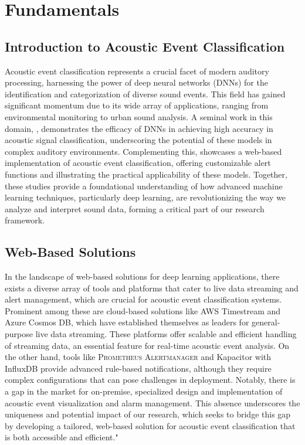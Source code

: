 \chapter{Fundamentals}
\section{Introduction to Acoustic Event Classification}

Acoustic event classification represents a crucial facet of modern auditory processing, harnessing the power of deep neural networks (DNNs) for the identification and categorization of diverse sound events. This field has gained significant momentum due to its wide array of applications, ranging from environmental monitoring to urban sound analysis. A seminal work in this domain, \cite{sampath2020low}, demonstrates the efficacy of DNNs in achieving high accuracy in acoustic signal classification, underscoring the potential of these models in complex auditory environments. Complementing this, \cite{sampath2019realtime} showcases a web-based implementation of acoustic event classification, offering customizable alert functions and illustrating the practical applicability of these models. Together, these studies provide a foundational understanding of how advanced machine learning techniques, particularly deep learning, are revolutionizing the way we analyze and interpret sound data, forming a critical part of our research framework.

\section{Web-Based Solutions}

In the landscape of web-based solutions for deep learning applications, there exists a diverse array of tools and platforms that cater to live data streaming and alert management, which are crucial for acoustic event classification systems. Prominent among these are cloud-based solutions like AWS Timestream\cite{AWSTimestream} and Azure Cosmos DB\cite{AzureCosmos}, which have established themselves as leaders for general-purpose live data streaming. These platforms offer scalable and efficient handling of streaming data, an essential feature for real-time acoustic event analysis. On the other hand, tools like \textsc{Prometheus} \textsc{Alertmanager}\cite{AlertManager} and Kapacitor with InfluxDB\cite{kapacitor} provide advanced rule-based notifications, although they require complex configurations that can pose challenges in deployment. Notably, there is a gap in the market for on-premise, specialized design and implementation of acoustic event visualization and alarm management. This absence underscores the uniqueness and potential impact of our research, which seeks to bridge this gap by developing a tailored, web-based solution for acoustic event classification that is both accessible and efficient."

